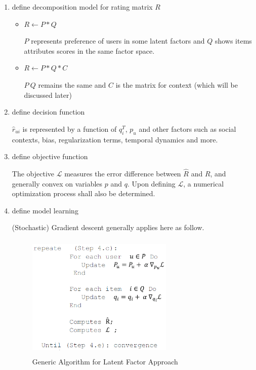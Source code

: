\documentclass[letter paper, 11pt]{article}
\begin{document}
	\begin{enumerate}
		\item define decomposition model for rating matrix $R$
		
		\begin{itemize}
			\item $ R \leftarrow P * Q $ 
			
			$P$ represents preference of users in some latent factors and $Q$ shows items attributes scores in the same factor space.
			
			\item $ R \leftarrow P * Q * C$
			
			$P\ Q$ remains the same and $C$ is the matrix for context (which will be discussed later)
		\end{itemize}
		
		\item define decision function
		
		$\hat{r}_{ui}$ is represented by a function of $q_i^T$, $p_u$ and other factors such as social contexts, bias, regularization terms, temporal dynamics and more.
		
		
		\item define objective function
		
		The objective $\mathcal{L}$ measures the error difference between $\hat{R}$ and $R$, and generally convex on variables $p$ and $q$. Upon defining $\mathcal{L}$, a numerical optimization process shall also be determined.
		
		\item define model learning
		
		(Stochastic) Gradient descent generally applies here as follow. 
		\begin{figure}[h]
			\caption{Generic Algorithm for Latent Factor Approach\cite{latentFactor-RS}}
			\centering
			\includegraphics[width=7cm, height=6cm]{Latent-factor-Framework1.png}
		\end{figure}
		
	\end{enumerate}
\end{document}
